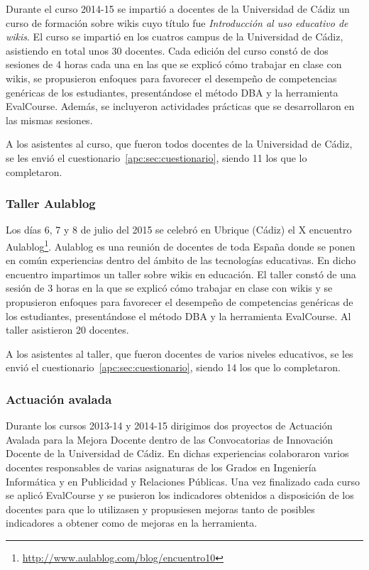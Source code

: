 		Durante el curso 2014-15 se impartió a docentes de la Universidad de Cádiz un curso de formación sobre wikis cuyo título fue \emph{Introducción al uso educativo de wikis}. El curso se impartió en los cuatros campus de la Universidad de Cádiz, asistiendo en total unos 30 docentes. Cada edición del curso constó de dos sesiones de 4 horas cada una en las que se explicó cómo trabajar en clase con wikis, se propusieron enfoques para favorecer el desempeño de competencias genéricas de los estudiantes, presentándose el método DBA y la herramienta EvalCourse.  Además, se incluyeron actividades prácticas que se desarrollaron en las mismas sesiones. 

A los asistentes al curso, que fueron todos docentes de la Universidad de Cádiz, se les envió el cuestionario~\ref{apc:sec:cuestionario}, siendo 11 los que lo completaron.

	\subsubsection*{Taller Aulablog}

		Los días 6, 7 y 8 de julio del 2015 se celebró en Ubrique (Cádiz) el X encuentro Aulablog\footnote{\url{http://www.aulablog.com/blog/encuentro10}}. Aulablog es una reunión de docentes de toda España donde se ponen en común experiencias  dentro del ámbito de las tecnologías educativas. En dicho encuentro impartimos un taller sobre wikis en educación. El taller constó de una sesión de 3 horas en la que se explicó cómo trabajar en clase con wikis y se propusieron enfoques para favorecer el desempeño de competencias genéricas de los estudiantes, presentándose el método DBA y la herramienta EvalCourse. Al taller asistieron 20 docentes.

A los asistentes al taller, que fueron docentes de varios niveles educativos, se les envió el cuestionario~\ref{apc:sec:cuestionario}, siendo 14 los que lo completaron.

	\subsubsection*{Actuación avalada}

		Durante los cursos 2013-14 y 2014-15 dirigimos dos proyectos de Actuación Avalada para la Mejora Docente dentro de las Convocatorias de Innovación Docente de la Universidad de Cádiz. En dichas experiencias colaboraron varios docentes responsables de varias asignaturas de los Grados en Ingeniería Informática y en Publicidad y Relaciones Públicas. Una vez finalizado cada curso se aplicó EvalCourse y se pusieron los indicadores obtenidos a disposición de los docentes para que lo utilizasen y propusiesen mejoras tanto de posibles indicadores a obtener como de mejoras en la herramienta.

